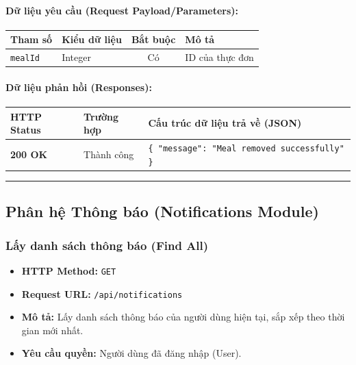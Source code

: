 \documentclass[12pt,a4paper]{article}
\begin{document}
\paragraph{Dữ liệu yêu cầu (Request Payload/Parameters):}
\begin{longtable}{|>{\raggedright\arraybackslash}p{2.8cm}|>{\raggedright\arraybackslash}p{2.2cm}|c|>{\raggedright\arraybackslash}p{7.0cm}|}
\hline
\textbf{Tham số} & \textbf{Kiểu dữ liệu} & \textbf{Bắt buộc} & \textbf{Mô tả} \\ \hline
\endhead
\texttt{mealId} & Integer & Có & ID của thực đơn \\ \hline
\end{longtable}

\paragraph{Dữ liệu phản hồi (Responses):}
\begin{longtable}{|>{\raggedright\arraybackslash}p{2.8cm}|>{\raggedright\arraybackslash}p{3.2cm}|>{\raggedright\arraybackslash}p{8.0cm}|}
\hline
\textbf{HTTP Status} & \textbf{Trường hợp} & \textbf{Cấu trúc dữ liệu trả về (JSON)} \\ \hline
\endhead
\textbf{200 OK} & Thành công & \texttt{\{ "message": "Meal removed successfully" \}} \\ \hline
\end{longtable}

\vskip 0.4cm
\noindent\rule{\textwidth}{0.3pt}
\vskip 0.4cm

\subsection{Phân hệ Thông báo (Notifications Module)}

\subsubsection{Lấy danh sách thông báo (Find All)}
\begin{itemize}[leftmargin=*]
    \item \textbf{HTTP Method:} \texttt{GET}
    \item \textbf{Request URL:} \texttt{/api/notifications}
    \item \textbf{Mô tả:} Lấy danh sách thông báo của người dùng hiện tại, sắp xếp theo thời gian mới nhất.
    \item \textbf{Yêu cầu quyền:} Người dùng đã đăng nhập (User).
\end{itemize}
\end{document}
